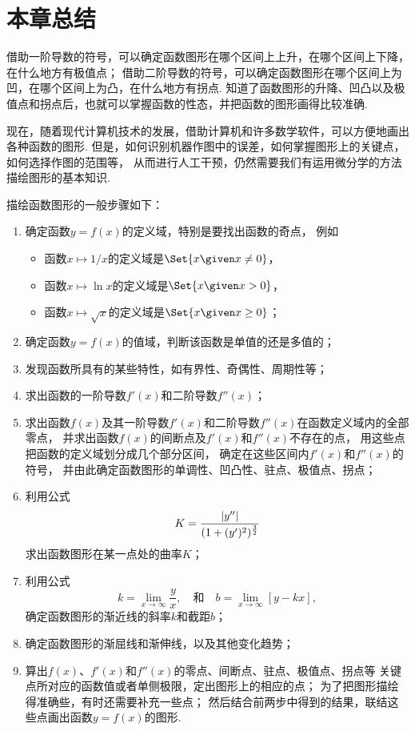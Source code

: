 \section{本章总结}
借助一阶导数的符号，可以确定函数图形在哪个区间上上升，在哪个区间上下降，在什么地方有极值点；
借助二阶导数的符号，可以确定函数图形在哪个区间上为凹，在哪个区间上为凸，在什么地方有拐点.
知道了函数图形的升降、凹凸以及极值点和拐点后，也就可以掌握函数的性态，并把函数的图形画得比较准确.

现在，随着现代计算机技术的发展，借助计算机和许多数学软件，可以方便地画出各种函数的图形.
但是，如何识别机器作图中的误差，如何掌握图形上的关键点，如何选择作图的范围等，
从而进行人工干预，仍然需要我们有运用微分学的方法描绘图形的基本知识.

描绘函数图形的一般步骤如下：\begin{enumerate}
	\item 确定函数\(y=f(x)\)的定义域，特别是要找出函数的奇点，
	例如\begin{itemize}
		\item 函数\(x \mapsto 1/x\)的定义域是\(\Set{ x \given x\neq0 }\)，
		\item 函数\(x \mapsto \ln x\)的定义域是\(\Set{ x \given x>0 }\)，
		\item 函数\(x \mapsto \sqrt{x}\)的定义域是\(\Set{ x \given x\geq0 }\)；
	\end{itemize}

	\item 确定函数\(y=f(x)\)的值域，判断该函数是单值的还是多值的；

	\item 发现函数所具有的某些特性，如有界性、奇偶性、周期性等；

	\item 求出函数的一阶导数\(f'(x)\)和二阶导数\(f''(x)\)；

	\item 求出函数\(f(x)\)及其一阶导数\(f'(x)\)和二阶导数\(f''(x)\)在函数定义域内的全部零点，
	并求出函数\(f(x)\)的间断点及\(f'(x)\)和\(f''(x)\)不存在的点，
	用这些点把函数的定义域划分成几个部分区间，
	确定在这些区间内\(f'(x)\)和\(f''(x)\)的符号，
	并由此确定函数图形的单调性、凹凸性、驻点、极值点、拐点；

	\item 利用公式\[
		K = \frac{\abs{y''}}{(1+(y')^2)^{\frac32}}
	\]求出函数图形在某一点处的曲率\(K\)；

	\item 利用公式\[
		k = \lim_{x\to\infty} \frac{y}{x},
		\quad\text{和}\quad
		b = \lim_{x\to\infty} \left[y - kx\right],
	\]确定函数图形的渐近线的斜率\(k\)和截距\(b\)；

	\item 确定函数图形的渐屈线和渐伸线，以及其他变化趋势；

	\item 算出\(f(x)\)、\(f'(x)\)和\(f''(x)\)的零点、间断点、驻点、极值点、拐点等
	关键点所对应的函数值或者单侧极限，定出图形上的相应的点；
	为了把图形描绘得准确些，有时还需要补充一些点；
	然后结合前两步中得到的结果，联结这些点画出函数\(y=f(x)\)的图形.
\end{enumerate}
